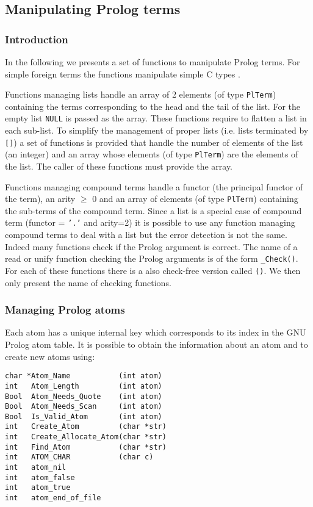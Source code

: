 \subsection{Manipulating Prolog terms}
\label{Manipulating-Prolog-terms}

\subsubsection{Introduction}
\label{Introduction:(Manipulating-Prolog-terms)}
In the following we presents a set of functions to manipulate Prolog terms.
For simple foreign terms the functions manipulate simple C types
. 

Functions managing lists handle an array of 2 elements (of type
\texttt{PlTerm}) containing the terms corresponding to the head and the tail
of the list. For the empty list \texttt{NULL} is passed as the array. These
functions require to flatten a list in each sub-list. To simplify the
management of proper lists (i.e. lists terminated by \texttt{[]}) a set of
functions is provided that handle the number of elements of the list (an
integer) and an array whose elements (of type \texttt{PlTerm}) are the
elements of the list. The caller of these functions must provide the array.

Functions managing compound terms handle a functor (the principal functor of
the term), an arity  $\geq$ 0 and an array of  elements
(of type \texttt{PlTerm}) containing the sub-terms of the compound term.
Since a list is a special case of compound term (functor = \texttt{'.'} and
arity=2) it is possible to use any function managing compound terms to deal
with a list but the error detection is not the same. Indeed many functions
check if the Prolog argument is correct. The name of a read or unify
function checking the Prolog arguments is of the form
\texttt{\_Check()}. For each of these functions there is a also
check-free version called \texttt{()}. We then only present the
name of checking functions.

\subsubsection{Managing Prolog atoms}
Each atom has a unique internal key which corresponds to its index in the
GNU Prolog atom table. It is possible to obtain the information about an atom
and to create new atoms using:

\begin{Indentation}
\begin{verbatim}
char *Atom_Name           (int atom)
int   Atom_Length         (int atom)
Bool  Atom_Needs_Quote    (int atom)
Bool  Atom_Needs_Scan     (int atom)
Bool  Is_Valid_Atom       (int atom)
int   Create_Atom         (char *str)
int   Create_Allocate_Atom(char *str)
int   Find_Atom           (char *str)
int   ATOM_CHAR           (char c)
int   atom_nil
int   atom_false
int   atom_true
int   atom_end_of_file
\end{verbatim}
\end{Indentation}

